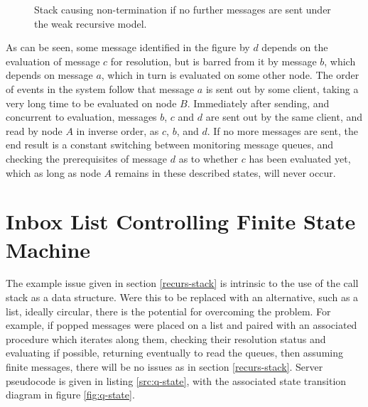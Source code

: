 \documentclass[a4paper,10pt]{article}
\begin{document}
\begin{figure}
	\centering
	\caption{\label{fig:deps-block-stack}Stack causing non-termination if
	no further messages are sent under the weak recursive model.} 
\end{figure}

As can be seen, some message identified in the figure by \(d\) depends on the
evaluation of message \(c\) for resolution, but is barred from it by message
\(b\), which depends on message \(a\), which in turn is evaluated on some other
node.
The order of events in the system follow that message \(a\) is sent out by some
client, taking a very long time to be evaluated on node \(B\).
Immediately after sending, and concurrent to evaluation, messages \(b\), \(c\)
and \(d\) are sent out by the same client, and read by node \(A\) in inverse
order, as \(c\), \(b\), and \(d\).
If no more messages are sent, the end result is a constant switching between
monitoring message queues, and checking the prerequisites of message \(d\) as
to whether \(c\) has been evaluated yet, which as long as node \(A\) remains in
these described states, will never occur.

\section{Inbox List Controlling Finite State Machine}
\label{inbox-list}

The example issue given in section \ref{recurs-stack} is intrinsic to the use
of the call stack as a data structure.
Were this to be replaced with an alternative, such as a list, ideally circular,
there is the potential for overcoming the problem.
For example, if popped messages were placed on a list and paired with an
associated procedure which iterates along them, checking their resolution
status and evaluating if possible, returning eventually to read the queues,
then assuming finite messages, there will be no issues as in section
\ref{recurs-stack}.
Server pseudocode is given in listing \ref{src:q-state}, with the associated
state transition diagram in figure \ref{fig:q-state}.
\end{document}
